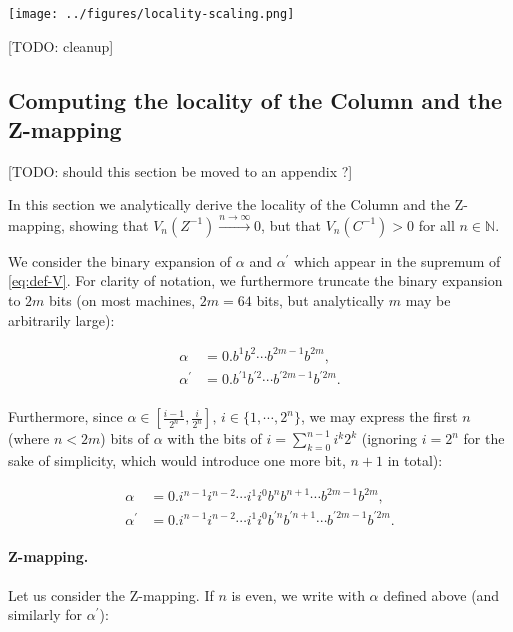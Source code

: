 \documentclass[10pt,letterpaper]{article}
\begin{document}

\texttt{[image: ../figures/locality-scaling.png]}

[TODO: cleanup]
\endif

\subsection{Computing the locality of the Column and the Z-mapping}
[TODO: should this section be moved to an appendix ?]

In this section we analytically derive the locality of the Column and the Z-mapping, showing that $V_n(Z^{-1}) \xrightarrow{n \to \infty} 0$, but that $V_n(C^{-1}) > 0$ for all $n \in \mathbb{N}$.

We consider the binary expansion of $\alpha$ and $\alpha^\prime$ which appear in the supremum of \autoref{eq:def-V}. For clarity of notation, we furthermore truncate the binary expansion to $2m$ bits (on most machines, $2m=64$ bits, but analytically $m$ may be arbitrarily large):

\begin{equation*} \begin{aligned}
\alpha &= 0. b^1 b^2 \cdots b^{2m-1} b^{2m},\\
\alpha^\prime &= 0. b^{\prime 1} b^{\prime 2} \cdots b^{\prime 2m-1} b^{\prime 2m}. \\
\end{aligned} \end{equation*}

Furthermore, since $\alpha \in \left[\frac{i-1}{2^n}, \frac{i}{2^n} \right],\, i \in \{1, \cdots, 2^n\}$, we may express the first $n$ (where $n < 2m$) bits of $\alpha$ with the bits of $i=\sum_{k=0}^{n-1} i^k 2^k$ (ignoring $i=2^n$ for the sake of simplicity, which would introduce one more bit, $n+1$ in total):

\begin{equation*} \begin{aligned}
\alpha &= 0. i^{n-1} i^{n-2} \cdots i^1 i^0 b^n b^{n+1} \cdots b^{2m-1} b^{2m},\\
\alpha^\prime &= 0. i^{n-1} i^{n-2} \cdots i^1 i^0 b^{\prime n} b^{\prime n+1} \cdots b^{\prime 2m-1} b^{\prime 2m}.
\end{aligned} \end{equation*}

\paragraph{Z-mapping.} Let us consider the Z-mapping. If $n$ is even, we write with $\alpha$ defined above (and similarly for $\alpha^\prime$):
\end{document}

